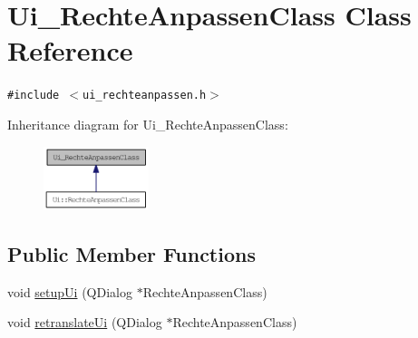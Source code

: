 \hypertarget{class_ui___rechte_anpassen_class}{
\section{Ui\_\-RechteAnpassenClass Class Reference}
\label{class_ui___rechte_anpassen_class}
}
{\tt \#include $<$ui\_\-rechteanpassen.h$>$}

Inheritance diagram for Ui\_\-RechteAnpassenClass:\nopagebreak
\begin{figure}[H]
\begin{center}
\leavevmode
\includegraphics[width=87pt]{class_ui___rechte_anpassen_class__inherit__graph}
\end{center}
\end{figure}
\subsection*{Public Member Functions}
\begin{CompactItemize}
\item 
void \hyperlink{class_ui___rechte_anpassen_class_018e703043acba210693fe35356e9ca2}{setupUi} (QDialog $\ast$RechteAnpassenClass)
\item 
void \hyperlink{class_ui___rechte_anpassen_class_4b57f6acd3eedec7366c62a8f11ec15b}{retranslateUi} (QDialog $\ast$RechteAnpassenClass)
\end{CompactItemize}
